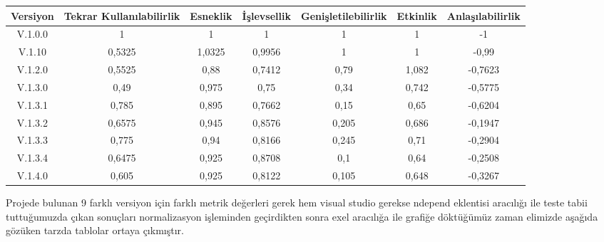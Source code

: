 \documentclass[conference]{IEEEtran}
\begin{document}
\begin{table}
\begin{tabular}{|c|c|c|c|c|c|c|}
\hline
\textbf{Versiyon} & \textbf{Tekrar Kullanılabilirlik} & \textbf{Esneklik} & \textbf{İşlevsellik} & \textbf{Genişletilebilirlik} & \textbf{Etkinlik} & \textbf{Anlaşılabilirlik} \\ \hline
V.1.0.0           & 1                                 & 1                 & 1                    & 1                            & 1                 & -1                        \\ \hline
V.1.10            & 0,5325                            & 1,0325            & 0,9956               & 1                            & 1                 & -0,99                     \\ \hline
V.1.2.0           & 0,5525                            & 0,88              & 0,7412               & 0,79                         & 1,082             & -0,7623                   \\ \hline
V.1.3.0           & 0,49                              & 0,975             & 0,75                 & 0,34                         & 0,742             & -0,5775                   \\ \hline
V.1.3.1           & 0,785                             & 0,895             & 0,7662               & 0,15                         & 0,65              & -0,6204                   \\ \hline
V.1.3.2           & 0,6575                            & 0,945             & 0,8576               & 0,205                        & 0,686             & -0,1947                   \\ \hline
V.1.3.3           & 0,775                             & 0,94              & 0,8166               & 0,245                        & 0,71              & -0,2904                   \\ \hline
V.1.3.4           & 0,6475                            & 0,925             & 0,8708               & 0,1                          & 0,64              & -0,2508                   \\ \hline
V.1.4.0           & 0,605                             & 0,925             & 0,8122               & 0,105                        & 0,648             & -0,3267                   \\ \hline
\end{tabular}
\end{table}

Projede bulunan 9 farklı versiyon için farklı metrik değerleri gerek hem visual studio gerekse ndepend eklentisi aracılığı ile teste tabii tuttuğumuzda çıkan  sonuçları normalizasyon işleminden geçirdikten sonra exel aracılığa ile grafiğe döktüğümüz zaman elimizde aşağıda gözüken tarzda tablolar ortaya çıkmıştır.
\end{document}
